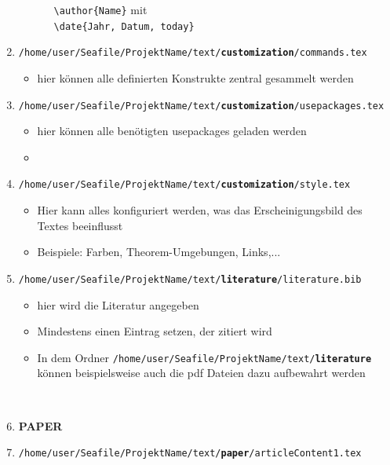 \begin{enumerate}
\begin{itemize}
		            ~~~\texttt{\textbackslash author\{Name\}} mit \\
		            ~~~\texttt{\textbackslash date\{Jahr, Datum, today\}}
	      \end{itemize}
	\item \texttt{/home/user/Seafile/ProjektName/text/\textbf{customization}/commands.tex}
	      \begin{itemize}
		      \item hier können alle definierten Konstrukte zentral gesammelt werden 
	      \end{itemize}
	\item \texttt{/home/user/Seafile/ProjektName/text/\textbf{customization}/usepackages.tex}
	      \begin{itemize}
		      \item hier können alle benötigten usepackages geladen werden 
		      \item[] 
	      \end{itemize}
	\item \texttt{/home/user/Seafile/ProjektName/text/\textbf{customization}/style.tex}
	      \begin{itemize}
		      \item Hier kann alles konfiguriert werden, was das Erscheinigungsbild des Textes beeinflusst
		      \item Beispiele: Farben, Theorem-Umgebungen, Links,...
	      \end{itemize}
	\item \texttt{/home/user/Seafile/ProjektName/text/\textbf{literature}/literature.bib}
	      \begin{itemize}
		      \item hier wird die Literatur angegeben
		      \item Mindestens einen Eintrag setzen, der zitiert wird
		      \item In dem Ordner \texttt{/home/user/Seafile/ProjektName/text/\textbf{literature}} können beispielsweise auch die pdf Dateien dazu aufbewahrt werden
	      \end{itemize}
	      ~\\
	\item[] \textbf{\large PAPER}
	\item \texttt{/home/user/Seafile/ProjektName/text/\textbf{paper}/articleContent1.tex}\\
	      \begin{itemize}

\end{itemize}
\end{enumerate}

